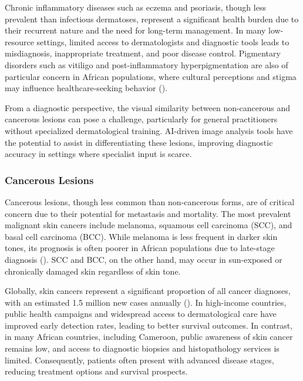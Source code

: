 \documentclass[
  12pt,
  oneside]{article}
\begin{document}
Chronic inflammatory diseases such as eczema and psoriasis, though less
prevalent than infectious dermatoses, represent a significant health
burden due to their recurrent nature and the need for long-term
management. In many low-resource settings, limited access to
dermatologists and diagnostic tools leads to misdiagnosis, inappropriate
treatment, and poor disease control. Pigmentary disorders such as
vitiligo and post-inflammatory hyperpigmentation are also of particular
concern in African populations, where cultural perceptions and stigma
may influence healthcare-seeking behavior
().

From a diagnostic perspective, the visual similarity between
non-cancerous and cancerous lesions can pose a challenge, particularly
for general practitioners without specialized dermatological training.
AI-driven image analysis tools have the potential to assist in
differentiating these lesions, improving diagnostic accuracy in settings
where specialist input is scarce.

\subsubsection{Cancerous Lesions}\label{cancerous-lesions}

Cancerous lesions, though less common than non-cancerous forms, are of
critical concern due to their potential for metastasis and mortality.
The most prevalent malignant skin cancers include melanoma, squamous
cell carcinoma (SCC), and basal cell carcinoma (BCC). While melanoma is
less frequent in darker skin tones, its prognosis is often poorer in
African populations due to late-stage diagnosis
(). SCC and BCC, on the
other hand, may occur in sun-exposed or chronically damaged skin
regardless of skin tone.

Globally, skin cancers represent a significant proportion of all cancer
diagnoses, with an estimated 1.5 million new cases annually
(). In high-income
countries, public health campaigns and widespread access to
dermatological care have improved early detection rates, leading to
better survival outcomes. In contrast, in many African countries,
including Cameroon, public awareness of skin cancer remains low, and
access to diagnostic biopsies and histopathology services is limited.
Consequently, patients often present with advanced disease stages,
reducing treatment options and survival prospects.
\end{document}
